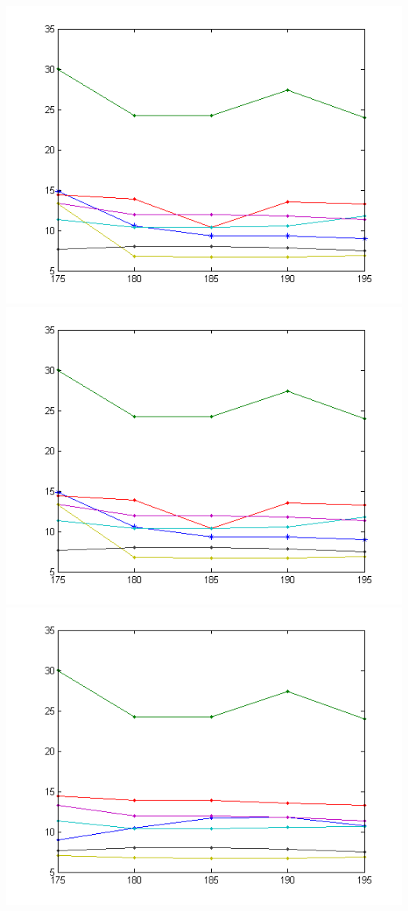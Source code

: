 \documentclass[conference]{IEEEtran}
\begin{document}
\includegraphics{s20}
\includegraphics{s20}
\includegraphics{s25}
\end{document}
